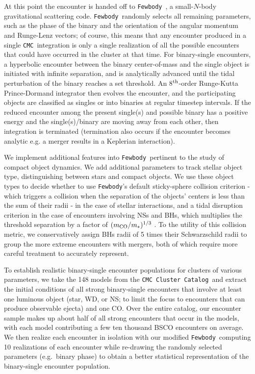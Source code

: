 \documentclass[twocolumn]{aastex631}
\newcommand{\CMC}{\texttt{CMC}}
\newcommand{\CMCcat}{\texttt{CMC Cluster Catalog}}
\newcommand{\fewbody}{\texttt{Fewbody}}
\begin{document}
At this point the encounter is handed off to \fewbody\ \citep{2004MNRAS.352....1F}, a small-$N$-body gravitational scattering code.
\fewbody\ randomly selects all remaining parameters, such as the phase of the binary and the orientation of the angular momentum and Runge-Lenz vectors; of course, this means that any encounter produced in a single \CMC\ integration is only a single realization of all the possible encounters that could have occurred in the cluster at that time.
For binary-single encounters, a hyperbolic encounter between the binary center-of-mass and the single object is initiated with infinite separation, and is analytically advanced until the tidal perturbation of the binary reaches a set threshold.
An 8$^{\rm th}$-order Runge-Kutta Prince-Dormand integrator then evolves the encounter, and the participating objects are classified as singles or into binaries at regular timestep intervals.
If the reduced encounter among the present single(s) and possible binary has a positive energy and the single(s)/binary are moving away from each other, then integration is terminated (termination also occurs if the encounter becomes analytic e.g. a merger results in a Keplerian interaction).

We implement additional features into \fewbody\ pertinent to the study of compact object dynamics.
We add additional parameters to track stellar object type, distinguishing between stars and compact objects.%
We use these object types to decide whether to use \fewbody's default sticky-sphere collision criterion - which triggers a collision when the separation of the objects' centers is less than the sum of their radii - in the case of stellar interactions, and a tidal disruption criterion in the case of encounters involving NSs and BHs, which multiplies the threshold separation by a factor of $(m_{\rm CO} / m_{*})^{1/3}$ \citep[as was done in][]{Kremer2019}.
To the utility of this collision metric, we conservatively assign BHs radii of 5 times their Schwarzschild radii to group the more extreme encounters with mergers, both of which require more careful treatment to accurately represent.

To establish realistic binary-single encounter populations for clusters of various parameters, we take the 148 models from the \CMCcat\ and extract the initial conditions of all strong binary-single encounters that involve at least one luminous object (star, WD, or NS; to limit the focus to encounters that can produce observable ejecta) and one CO.
Over the entire catalog, our encounter sample makes up about half of all strong encounters that occur in the models, with each model contributing a few ten thousand BSCO encounters on average.
We then realize each encounter in isolation with our modified \fewbody\, computing 10 realizations of each encounter while re-drawing the randomly selected parameters (e.g.~binary phase) to obtain a better statistical representation of the binary-single encounter population.
\end{document}
